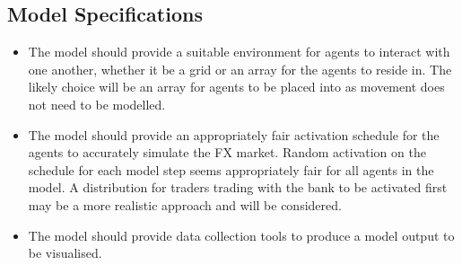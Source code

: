 \subsection{Model Specifications}
\begin{itemize}
\item The model should provide a suitable environment for agents to interact with one another, whether it be a grid or an array for the agents to reside in. The likely choice will be an array for agents to be placed into as movement does not need to be modelled.
\item The model should provide an appropriately fair activation schedule for the agents to accurately simulate the FX market. Random activation on the schedule for each model step seems appropriately fair for all agents in the model. A distribution for traders trading with the bank to be activated first may be a more realistic approach and will be considered.
\item The model should provide data collection tools to produce a model output to be visualised.
\end{itemize}
